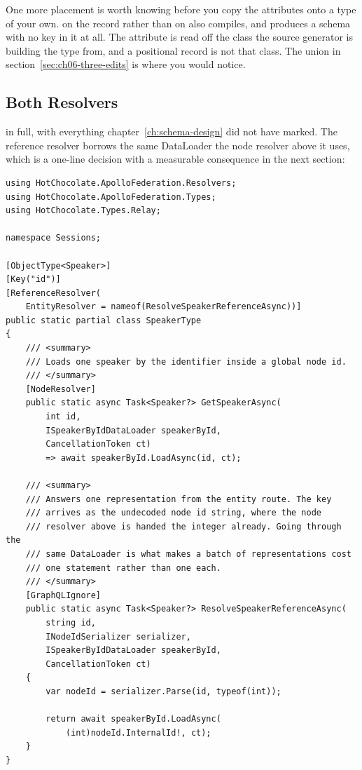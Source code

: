 %
One more placement is worth knowing before you copy the attributes onto a type
of your own. \code{[Key("id")]} on the  record rather than on
 also compiles, and produces a schema with no key in it at
all. The attribute is read off the class the source generator is building the
type from, and a positional record is not that class. The union in
section~\ref{sec:ch06-three-edits} is where you would notice.

\subsection{Both Resolvers}

%
 in full, with everything chapter~\ref{ch:schema-design}
did not have marked. The reference resolver borrows the same DataLoader the node
resolver above it uses, which is a one-line decision with a measurable
consequence in the next section:

\begin{verbatim}
using HotChocolate.ApolloFederation.Resolvers;
using HotChocolate.ApolloFederation.Types;
using HotChocolate.Types.Relay;

namespace Sessions;

[ObjectType<Speaker>]
[Key("id")]
[ReferenceResolver(
    EntityResolver = nameof(ResolveSpeakerReferenceAsync))]
public static partial class SpeakerType
{
    /// <summary>
    /// Loads one speaker by the identifier inside a global node id.
    /// </summary>
    [NodeResolver]
    public static async Task<Speaker?> GetSpeakerAsync(
        int id,
        ISpeakerByIdDataLoader speakerById,
        CancellationToken ct)
        => await speakerById.LoadAsync(id, ct);

    /// <summary>
    /// Answers one representation from the entity route. The key
    /// arrives as the undecoded node id string, where the node
    /// resolver above is handed the integer already. Going through the
    /// same DataLoader is what makes a batch of representations cost
    /// one statement rather than one each.
    /// </summary>
    [GraphQLIgnore]
    public static async Task<Speaker?> ResolveSpeakerReferenceAsync(
        string id,
        INodeIdSerializer serializer,
        ISpeakerByIdDataLoader speakerById,
        CancellationToken ct)
    {
        var nodeId = serializer.Parse(id, typeof(int));

        return await speakerById.LoadAsync(
            (int)nodeId.InternalId!, ct);
    }
}
\end{verbatim}

